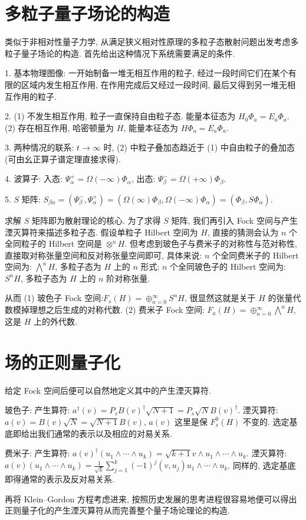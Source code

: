 \documentclass{article}
\begin{document}
\section{多粒子量子场论的构造}
类似于非相对性量子力学, 从满足狭义相对性原理的多粒子态散射问题出发考虑多粒子量子场论的构造. 首先给出这种情况下系统需要满足的条件.
\par
1. 基本物理图像: 一开始制备一堆无相互作用的粒子, 经过一段时间它们在某个有限的区域内发生相互作用, 在作用完成后又经过一段时间, 最后又得到另一堆无相互作用的粒子.
\par
2. (1) 不发生相互作用, 粒子一直保持自由粒子态. 能量本征态为 $H_{0}\Phi_{a}=E_{a}\Phi_{a}$. (2) 存在相互作用, 哈密顿量为 $H$, 能量本征态为 $H\Phi_{a}=E_{a}\Phi_{a}$.
\par
3. 两种情况的联系: $t\rightarrow\infty$ 时, (2) 中粒子叠加态趋近于 (1) 中自由粒子的叠加态 (可由幺正算子谱定理直接求得).
\par
4. 波算子: 入态: $\Psi_{\alpha}^{+}=\Omega(-\infty)\Phi_{\alpha}$, 出态: $\Psi_{\beta}^{-}=\Omega(+\infty)\Phi_{\beta}$.
\par
5. $S$ 矩阵: $S_{\beta\alpha}=(\Psi_{\beta}^{-},\Psi_{\alpha}^{+})=(\Omega(\infty)\Phi_{\beta},\Omega(-\infty)\Phi_{\alpha})=(\Phi_{\beta},S\Phi_{\alpha})$.
\par
求解 $S$ 矩阵即为散射理论的核心. 为了求得 $S$ 矩阵, 我们再引入 Fock 空间与产生湮灭算符来描述多粒子态. 假设单粒子 Hilbert 空间为 $H$, 直接的猜测会认为 $n$ 个全同粒子的 Hilbert 空间是 $\otimes^{n}H$. 但考虑到玻色子与费米子的对称性与范对称性, 直接取对称张量空间和反对称张量空间即可, 具体来说: $n$ 个全同费米子的 Hilbert 空间为: $\bigwedge^{n}H$, 多粒子态为 $H$ 上的 $n$ 形式; $n$ 个全同玻色子的 Hilbert 空间为: $S^{n}H$, 多粒子态为 $H$ 上的 $n$ 阶对称张量.
\par
从而 (1) 玻色子 Fock 空间:$F_{s}(H)=\oplus_{n=0}^{\infty}S^{n}H$, 很显然这就是关于 $H$ 的张量代数模掉理想之后生成的对称代数. (2) 费米子 Fock 空间: $F_{a}(H)=\oplus_{n=0}^{\infty}\bigwedge^{n}H$, 这是 $H$ 上的外代数.
\section{场的正则量子化}
给定 Fock 空间后便可以自然地定义其中的产生湮灭算符.
\par
玻色子: 产生算符: $a^{\dagger}(v)=P_{s}B(v)^{\dagger}\sqrt{N+1}=P_{s}\sqrt{N}B(v)^{\dagger}$. 湮灭算符: $a(v)=B(v)\sqrt{N}=\sqrt{N+1}B(v)$, $a(v)$ 这里是保 $F_{s}^{0}(H)$ 不变的. 选定基底即给出我们通常的表示以及相应的对易关系.
\par
费米子: 产生算符: $a(v)^{\dagger}(u_{1}\wedge\cdots\wedge u_{k})=\sqrt{k+1}v\wedge u_{1}\wedge\cdots\wedge u_{k}$. 湮灭算符: $a(v)(u_{1}\wedge\cdots\wedge u_{k})=\frac{1}{\sqrt{k}}\sum_{j=1}^{k}(-1)^{j}(v,u_{j})u_{1}\wedge\cdots\wedge u_{k}$. 同样的, 选定基底即得通常的表示及反对易关系.
\par
再将 Klein--Gordon 方程考虑进来, 按照历史发展的思考进程很容易地便可以得出正则量子化的产生湮灭算符从而完善整个量子场论理论的构造.
\end{document}
